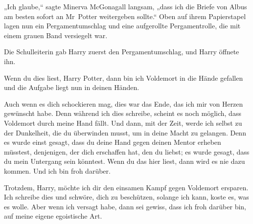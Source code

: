 „Ich glaube,“ sagte Minerva McGonagall langsam, „dass ich die Briefe von Albus am besten sofort an Mr~Potter weitergeben sollte.“
Oben auf ihrem Papierstapel lagen nun ein Pergamentumschlag und eine aufgerollte Pergamentrolle, die mit einem grauen Band versiegelt war.

Die Schulleiterin gab Harry zuerst den Pergamentumschlag, und Harry öffnete ihn.

\later

\begin{writtenNote}
Wenn du dies liest, Harry Potter, dann bin ich Voldemort in die Hände gefallen und die Aufgabe liegt nun in deinen Händen.

Auch wenn es dich schockieren mag, dies war das Ende, das ich mir von Herzen gewünscht habe. Denn während ich dies schreibe, scheint es noch möglich, dass Voldemort durch meine Hand fällt. Und dann, mit der Zeit, werde ich selbst zu der Dunkelheit, die du überwinden musst, um in deine Macht zu gelangen. Denn es wurde einst gesagt, dass du deine Hand gegen deinen Mentor erheben müsstest, denjenigen, der dich erschaffen hat, den du liebst; es wurde gesagt, dass du mein Untergang sein könntest.
Wenn du das hier liest, dann wird es nie dazu kommen. Und ich bin froh darüber.

Trotzdem, Harry, möchte ich dir den einsamen Kampf gegen Voldemort ersparen.
Ich schreibe dies und schwöre, dich zu beschützen, solange ich kann, koste es, was es wolle. Aber wenn ich versagt habe, dann sei gewiss, dass ich froh darüber bin, auf meine eigene egoistische Art.


\end{writtenNote}
